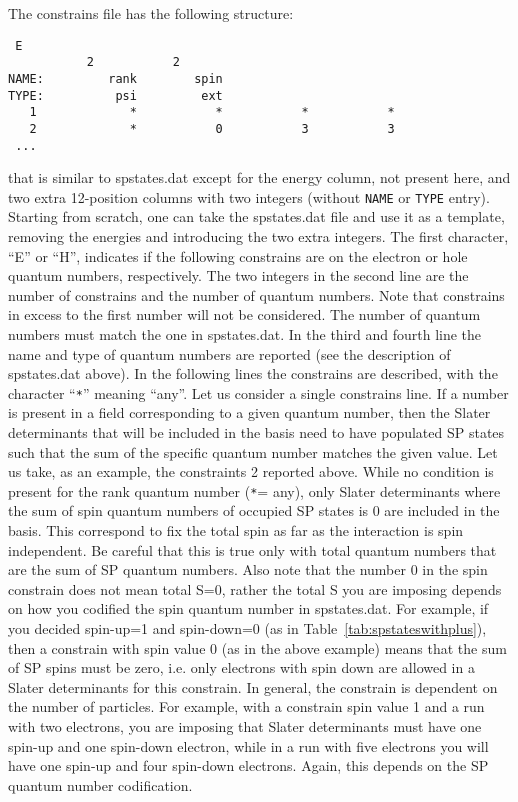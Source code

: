 \documentclass[12pt,twoside]{article}
\begin{document}
The constrains file has the following structure:
\begin{verbatim}
 E
           2           2
NAME:         rank        spin
TYPE:          psi         ext
   1             *           *           *           *
   2             *           0           3           3
 ...
\end{verbatim}
\vspace{2 mm}
that is similar to \textsf{spstates.dat} except for the energy column,
not present here, and two extra 12-position columns with two integers
(without \verb#NAME# or \verb#TYPE# entry).
Starting from scratch, one can take the \textsf{spstates.dat} file and
use it as a template, removing the energies and introducing the two
extra integers.  The first character, ``\textsf{E}'' or
``\textsf{H}'', indicates if the following constrains are on the
electron or hole quantum numbers, respectively.  The two integers in
the second line are the number of constrains and the number of quantum
numbers.  Note that constrains in excess to the first number will not
be considered.  The number of quantum numbers must match the one in
\textsf{spstates.dat}.  In the third and fourth line the name and type
of quantum numbers are reported (see the description of
\textsf{spstates.dat} above).  In the following lines the constrains
are described, with the character ``\verb#*#'' meaning ``any''. Let
us consider a single constrains line. If a number is present in a
field corresponding to a given quantum number, then the Slater
determinants that will be included in the basis need to have populated
SP states such that the sum of the specific quantum number matches the
given value.  Let us take, as an example, the constraints 2 reported
above.  While no condition is present for the \textsf{rank} quantum
number (\verb#*#= any), only Slater determinants where the sum of
\textsf{spin} quantum numbers of occupied SP states is 0 are included
in the basis.  This correspond to fix the total spin as far as the
interaction is spin independent. Be careful that this is true only
with total quantum numbers that are the sum of SP quantum numbers.
Also note that the number 0 in the spin constrain does not mean total
S=0, rather the total S you are imposing depends on how you codified
the spin quantum number in \textsf{spstates.dat}. For example, if you
decided spin-up=1 and spin-down=0 (as in
Table~\ref{tab:spstateswithplus}), then a constrain with spin value 0
(as in the above example) means that the sum of SP spins must be zero,
i.e. only electrons with spin down are allowed in a Slater
determinants for this constrain. In general, the constrain is
dependent on the number of particles. For example, with a constrain
spin value 1 and a run with two electrons, you are imposing that
Slater determinants must have one spin-up and one spin-down electron,
while in a run with five electrons you will have one spin-up and four
spin-down electrons. Again, this depends on the SP quantum number
codification.
\end{document}
